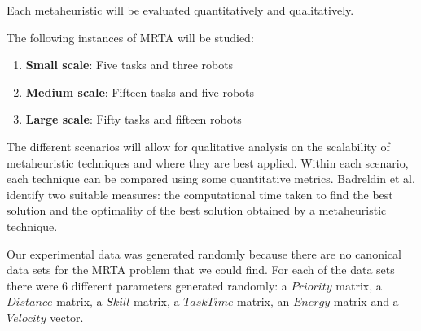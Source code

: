 \documentclass[a4paper]{article}
\begin{document}





Each metaheuristic will be evaluated quantitatively and qualitatively.

The following instances of MRTA will be studied:
\begin{enumerate}
\item \textbf{Small scale}: Five tasks and three robots
\item \textbf{Medium scale}: Fifteen tasks and five robots
\item \textbf{Large scale}: Fifty tasks and fifteen robots
\end{enumerate}

The different scenarios will allow for qualitative analysis on the scalability of metaheuristic techniques and where they are best applied. Within each scenario, each technique can be compared using some quantitative metrics. Badreldin et al. \cite{Badreldin} identify two suitable measures: the computational time taken to find the best solution and the optimality of the best solution obtained by a metaheuristic technique.

Our experimental data was generated randomly because there are no canonical data sets for the MRTA problem that we could find. For each of the data sets there were 6 different parameters generated randomly: a $\mathit{Priority}$ matrix, a $\mathit{Distance}$ matrix, a $\mathit{Skill}$ matrix, a $\mathit{Task Time}$ matrix, an $\mathit{Energy}$ matrix and a $\mathit{Velocity}$ vector.
\end{document}
